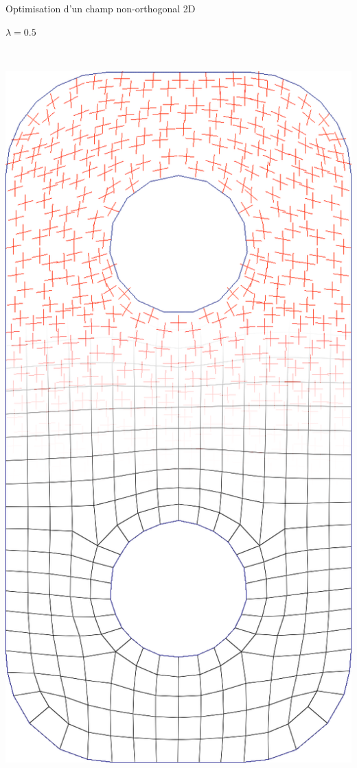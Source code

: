 \begin{frame}{Optimisation d'un champ non-orthogonal 2D}
\begin{minipage}[b]{0.15\textwidth}
        $\lambda = 0.5$
    \end{minipage}
    \ \ \ 
    \begin{minipage}[b]{0.15\textwidth}
        \centering
        \includegraphics[width=\textwidth]{img_spm_ff/perced_16}

\end{minipage}
\end{frame}
